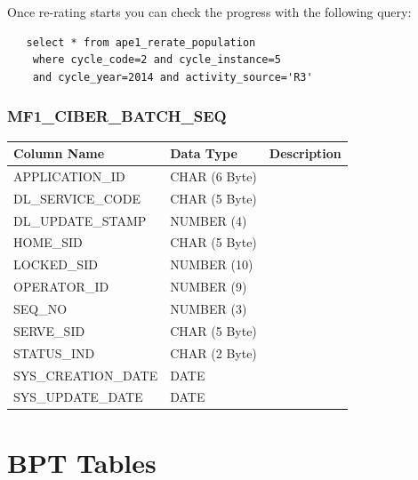 \documentclass[12pt,twoside]{article}
\begin{document}
\normalsize

  Once re-rating starts you can check the progress with the following query:
\begin{verbatim}
   select * from ape1_rerate_population 
    where cycle_code=2 and cycle_instance=5 
    and cycle_year=2014 and activity_source='R3'
\end{verbatim}
  
\subsubsection{MF1\_CIBER\_BATCH\_SEQ}
\label{sec-8-3-9}

\scriptsize

\begin{center}
\begin{tabular}{lll}
\hline
 \textbf{Column Name}  &  \textbf{Data Type}  &  \textbf{Description}  \\
\hline
 APPLICATION\_ID       &  CHAR (6 Byte)       &                        \\
 DL\_SERVICE\_CODE     &  CHAR (5 Byte)       &                        \\
 DL\_UPDATE\_STAMP     &  NUMBER (4)          &                        \\
 HOME\_SID             &  CHAR (5 Byte)       &                        \\
 LOCKED\_SID           &  NUMBER (10)         &                        \\
 OPERATOR\_ID          &  NUMBER (9)          &                        \\
 SEQ\_NO               &  NUMBER (3)          &                        \\
 SERVE\_SID            &  CHAR (5 Byte)       &                        \\
 STATUS\_IND           &  CHAR (2 Byte)       &                        \\
 SYS\_CREATION\_DATE   &  DATE                &                        \\
 SYS\_UPDATE\_DATE     &  DATE                &                        \\
\hline
\end{tabular}
\end{center}


\normalsize
\newpage
\section{BPT Tables}
\label{sec-9}
\end{document}
